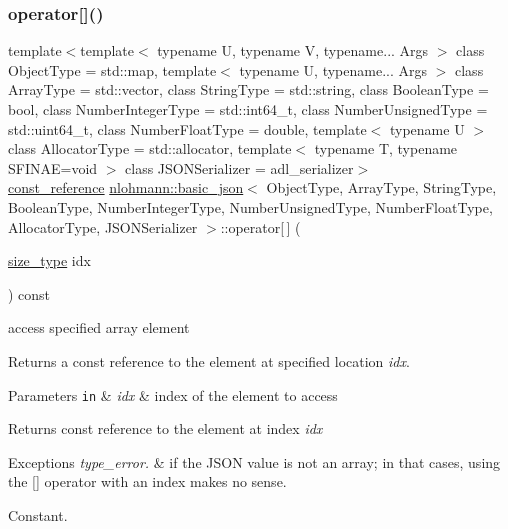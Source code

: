 \subsubsection{\texorpdfstring{operator[]()}{operator[]()}\hspace{0.1cm}{\footnotesize\ttfamily [2/8]}}
{\footnotesize\ttfamily template$<$template$<$ typename U, typename V, typename... Args $>$ class Object\+Type = std\+::map, template$<$ typename U, typename... Args $>$ class Array\+Type = std\+::vector, class String\+Type  = std\+::string, class Boolean\+Type  = bool, class Number\+Integer\+Type  = std\+::int64\+\_\+t, class Number\+Unsigned\+Type  = std\+::uint64\+\_\+t, class Number\+Float\+Type  = double, template$<$ typename U $>$ class Allocator\+Type = std\+::allocator, template$<$ typename T, typename S\+F\+I\+N\+A\+E=void $>$ class J\+S\+O\+N\+Serializer = adl\+\_\+serializer$>$ \\
\mbox{\hyperlink{classnlohmann_1_1basic__json_a4057c5425f4faacfe39a8046871786ca}{const\+\_\+reference}} \mbox{\hyperlink{classnlohmann_1_1basic__json}{nlohmann\+::basic\+\_\+json}}$<$ Object\+Type, Array\+Type, String\+Type, Boolean\+Type, Number\+Integer\+Type, Number\+Unsigned\+Type, Number\+Float\+Type, Allocator\+Type, J\+S\+O\+N\+Serializer $>$\+::operator\mbox{[}$\,$\mbox{]} (\begin{DoxyParamCaption}\item[{\mbox{\hyperlink{classnlohmann_1_1basic__json_a39f2cd0b58106097e0e67bf185cc519b}{size\+\_\+type}}}]{idx }\end{DoxyParamCaption}) const\hspace{0.3cm}{\ttfamily [inline]}}



access specified array element 

Returns a const reference to the element at specified location {\itshape idx}.


\begin{DoxyParams}[1]{Parameters}
\mbox{\tt in}  & {\em idx} & index of the element to access\\
\hline
\end{DoxyParams}
\begin{DoxyReturn}{Returns}
const reference to the element at index {\itshape idx} 
\end{DoxyReturn}

\begin{DoxyExceptions}{Exceptions}
{\em type\+\_\+error.} & if the J\+S\+ON value is not an array; in that cases, using the \mbox{[}\mbox{]} operator with an index makes no sense.\\
\hline
\end{DoxyExceptions}
Constant.


